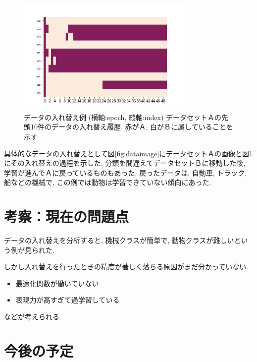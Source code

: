 \documentclass[twocolumn]{jarticle}     %
\begin{document}
\begin{figure}[tb]
	\begin{center}
		\includegraphics[clip,width=8.5cm]{swap_map.png}
		\caption{データの入れ替え例 (横軸:epoch, 縦軸:index) データセットＡの先頭10件のデータの入れ替え履歴. 赤がＡ, 白がＢに属していることを示す}
		\label{fig:swapmap}
	\end{center}
\end{figure}

具体的なデータの入れ替えとして図\ref{fig:dataimage}にデータセットＡの画像と図\ref{fig:swapmap}にその入れ替えの過程を示した. 分類を間違えてデータセットＢに移動した後, 学習が進んでＡに戻っているものもあった. 戻ったデータは, 自動車, トラック, 船などの機械で, この例では動物は学習できていない傾向にあった.



\section{考察：現在の問題点}
データの入れ替えを分析すると, 機械クラスが簡単で, 動物クラスが難しいという例が見られた.

しかし入れ替えを行ったときの精度が著しく落ちる原因がまだ分かっていない.
\begin{itemize}
	\item {最適化関数が働いていない}
	\item {表現力が高すぎて過学習している}
\end{itemize}
などが考えられる.

\section{今後の予定}
\end{document}
